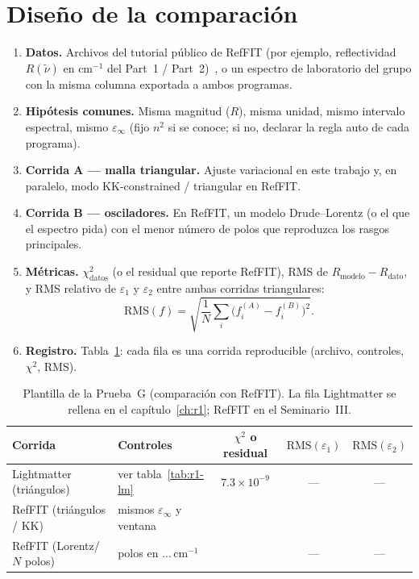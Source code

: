 \section{Dise\~no de la comparaci\'on}

\begin{enumerate}[leftmargin=*]
\item \textbf{Datos.} Archivos del tutorial p\'ublico de RefFIT (por ejemplo, reflectividad $R(\tilde\nu)$ en cm$^{-1}$ del Part~1 / Part~2)~\cite{guide}, o un espectro de laboratorio del grupo con la misma columna exportada a ambos programas.
\item \textbf{Hip\'otesis comunes.} Misma magnitud ($R$), misma unidad, mismo intervalo espectral, mismo $\varepsilon_\infty$ (fijo $n^{2}$ si se conoce; si no, declarar la regla auto de cada programa).
\item \textbf{Corrida A --- malla triangular.} Ajuste variacional en este trabajo y, en paralelo, modo KK-constrained / triangular en RefFIT.
\item \textbf{Corrida B --- osciladores.} En RefFIT, un modelo Drude--Lorentz (o el que el espectro pida) con el menor n\'umero de polos que reproduzca los rasgos principales.
\item \textbf{M\'etricas.} $\chi^{2}_{\mathrm{datos}}$ (o el residual que reporte RefFIT), RMS de $R_{\mathrm{modelo}}-R_{\mathrm{dato}}$, y RMS relativo de $\varepsilon_1$ y $\varepsilon_2$ entre ambas corridas triangulares:
\begin{equation}
\mathrm{RMS}(f)=\sqrt{\frac{1}{N}\sum_i\bigl(f^{(A)}_i-f^{(B)}_i\bigr)^{2}}.
\end{equation}
\item \textbf{Registro.} Tabla~\ref{tab:reffit-plantilla}: cada fila es una corrida reproducible (archivo, controles, $\chi^{2}$, RMS).
\end{enumerate}

\begin{table}[H]
\centering
\caption{Plantilla de la Prueba~G (comparaci\'on con RefFIT). La fila Lightmatter se rellena en el cap\'itulo~\ref{ch:r1}; RefFIT en el Seminario~III.}
\label{tab:reffit-plantilla}
\begin{tabular}{@{}lp{3.6cm}ccc@{}}
\toprule
Corrida & Controles & $\chi^{2}$ o residual & $\mathrm{RMS}(\varepsilon_1)$ & $\mathrm{RMS}(\varepsilon_2)$ \\
\midrule
Lightmatter (tri\'angulos) & ver tabla~\ref{tab:r1-lm} & $7.3\times 10^{-9}$ & --- & --- \\
RefFIT (tri\'angulos / KK) & mismos $\varepsilon_\infty$ y ventana &  &  &  \\
RefFIT (Lorentz/$N$ polos) & polos en $\ldots$\,cm$^{-1}$ &  & --- & --- \\
\bottomrule
\end{tabular}
\end{table}

